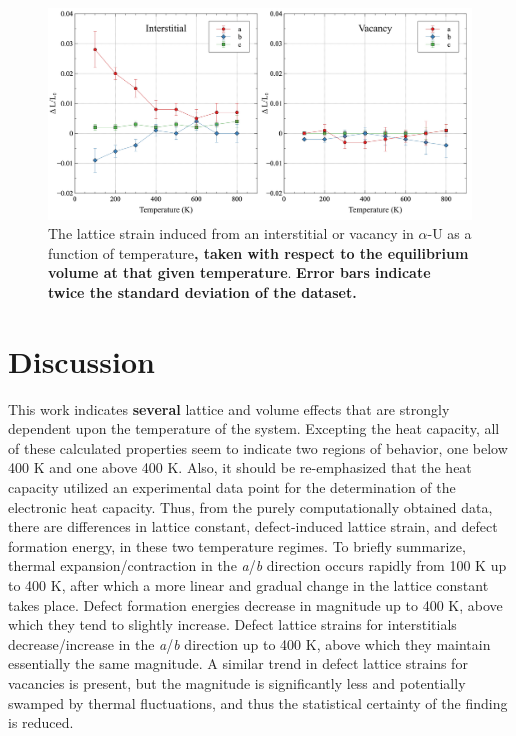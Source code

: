 \documentclass[utf8]{frontiersSCNS} %
\providecommand{\DIFaddtex}[1]{{\bf #1}} %
\providecommand{\DIFdeltex}[1]{} %
\providecommand{\DIFaddbegin}{\protect\color{blue}} %
\providecommand{\DIFaddend}{\protect\color{black}} %
\providecommand{\DIFdelbegin}{\protect\color{red}} %
\providecommand{\DIFdelend}{\protect\color{black}} %
\providecommand{\DIFaddFL}[1]{\DIFadd{#1}} %
\providecommand{\DIFaddbeginFL}{} %
\providecommand{\DIFaddendFL}{} %
\providecommand{\DIFdelbeginFL}{} %
\providecommand{\DIFdelendFL}{} %
\providecommand{\DIFadd}[1]{\texorpdfstring{\DIFaddtex{#1}}{#1}} %
\providecommand{\DIFdel}[1]{\texorpdfstring{\DIFdeltex{#1}}{}} %
\begin{document}
 \begin{figure}[hbt]
	\centering
	\DIFdelbeginFL %
\DIFdelendFL \DIFaddbeginFL \includegraphics[width=1.0\textwidth]{defect_strain.jpg}
  \DIFaddendFL \caption{The lattice strain induced from an interstitial or vacancy in $\alpha$-U as a function of temperature\DIFaddbeginFL \DIFaddFL{, taken with respect to the equilibrium volume at that given temperature}\DIFaddendFL . \DIFaddbeginFL \DIFaddFL{Error bars indicate twice the standard deviation of the dataset.}\DIFaddendFL }\label{fig:strain}
\end{figure}

\FloatBarrier

\section{Discussion}

This work indicates \DIFdelbegin \DIFdel{a number of }\DIFdelend \DIFaddbegin \DIFadd{several }\DIFaddend lattice and volume effects that are strongly dependent upon the temperature of the system. Excepting the heat capacity, all of these calculated properties seem to indicate two regions of behavior, one below 400 K and one above 400 K. Also, it should be re-emphasized that the heat capacity utilized an experimental data point for the determination of the electronic heat capacity. Thus, from the purely computationally obtained data, there are differences in lattice constant, defect-induced lattice strain, and defect formation energy, in these two temperature regimes. To briefly summarize, thermal expansion\DIFdelbegin \DIFdel{expansion}\DIFdelend /contraction in the \textit{a}/\textit{b} direction occurs rapidly from 100 K up to 400 K, after which a more linear and gradual change in the lattice constant takes place. Defect formation energies decrease in magnitude up to 400 K, above which they tend to slightly increase. Defect lattice strains for interstitials decrease/increase in the \textit{a}/\textit{b} direction up to 400 K, above which they maintain essentially the same magnitude. A similar trend in defect lattice strains for vacancies is present, but the magnitude is significantly less and potentially swamped by thermal fluctuations, and thus the statistical certainty of the finding is reduced. 
\end{document}
